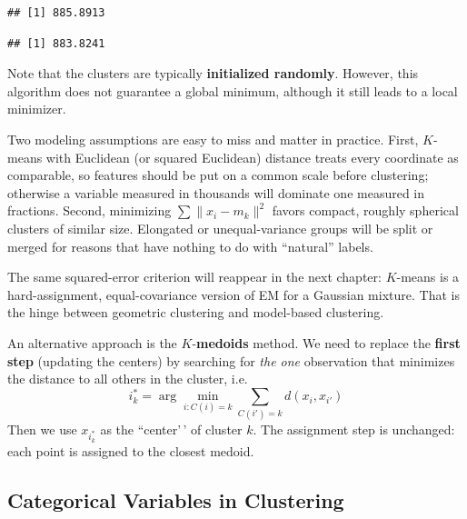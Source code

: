 \documentclass[
]{book}
\newenvironment{Shaded}{\begin{snugshade}}{\end{snugshade}}
\newcommand{\AttributeTok}[1]{\textcolor[rgb]{0.13,0.29,0.53}{#1}}
\newcommand{\CommentTok}[1]{\textcolor[rgb]{0.56,0.35,0.01}{\textit{#1}}}
\newcommand{\DecValTok}[1]{\textcolor[rgb]{0.00,0.00,0.81}{#1}}
\newcommand{\FunctionTok}[1]{\textcolor[rgb]{0.13,0.29,0.53}{\textbf{#1}}}
\newcommand{\NormalTok}[1]{#1}
\newcommand{\SpecialCharTok}[1]{\textcolor[rgb]{0.81,0.36,0.00}{\textbf{#1}}}
\begin{document}
\begin{verbatim}
## [1] 885.8913
\end{verbatim}

\begin{Shaded}
\end{Shaded}

\begin{verbatim}
## [1] 883.8241
\end{verbatim}

Note that the clusters are typically \textbf{initialized randomly}. However, this algorithm does not guarantee a global minimum, although it still leads to a local minimizer.

Two modeling assumptions are easy to miss and matter in practice. First, \(K\)-means with Euclidean (or squared Euclidean) distance treats every coordinate as comparable, so features should be put on a common scale before clustering; otherwise a variable measured in thousands will dominate one measured in fractions. Second, minimizing \(\sum \|x_i-m_k\|^2\) favors compact, roughly spherical clusters of similar size. Elongated or unequal-variance groups will be split or merged for reasons that have nothing to do with ``natural'' labels.

The same squared-error criterion will reappear in the next chapter: \(K\)-means is a hard-assignment, equal-covariance version of EM for a Gaussian mixture. That is the hinge between geometric clustering and model-based clustering.

An alternative approach is the \(K\)-\textbf{medoids} method. We need to replace the \textbf{first step} (updating the centers) by searching for \emph{the one} observation that minimizes the distance to all others in the cluster, i.e.~
\[i^*_k = \arg \min_{i:C(i)=k} \sum_{C(i')=k} d(x_i, x_{i'})\]
Then we use \(x_{i^*_k}\) as the ``center'\,' of cluster \(k\). The assignment step is unchanged: each point is assigned to the closest medoid.

\subsection{Categorical Variables in Clustering}\label{categorical-variables-in-clustering}
\end{document}
